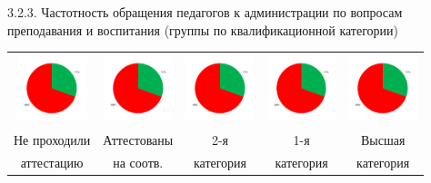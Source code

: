\begin{frame}{3.2.3. Частотность обращения педагогов к администрации по вопросам преподавания и воспитания (группы по квалификационной категории) }
\begin{tabular}{ccccc}
\includegraphics[width=2cm, height=2cm]{diag.png} & 
\includegraphics[width=2cm, height=2cm]{diag.png} & 
\includegraphics[width=2cm, height=2cm]{diag.png} & 
\includegraphics[width=2cm, height=2cm]{diag.png} & 
\includegraphics[width=2cm, height=2cm]{diag.png} \\
 Не проходили &  Аттестованы & 2-я &  1-я  & Высшая \\ 
  аттестацию   &  на соотв. & категория &  категория  & категория \\ 
\end{tabular}

\end{frame}


